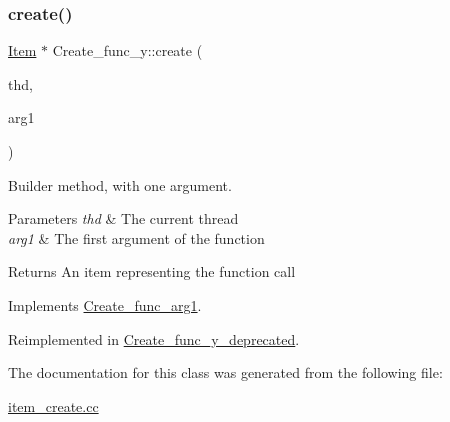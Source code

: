 \subsubsection{\texorpdfstring{create()}{create()}}
{\footnotesize\ttfamily \mbox{\hyperlink{classItem}{Item}} $\ast$ Create\+\_\+func\+\_\+y\+::create (\begin{DoxyParamCaption}\item[{T\+HD $\ast$}]{thd,  }\item[{\mbox{\hyperlink{classItem}{Item}} $\ast$}]{arg1 }\end{DoxyParamCaption})\hspace{0.3cm}{\ttfamily [virtual]}}

Builder method, with one argument. 
\begin{DoxyParams}{Parameters}
{\em thd} & The current thread \\
\hline
{\em arg1} & The first argument of the function \\
\hline
\end{DoxyParams}
\begin{DoxyReturn}{Returns}
An item representing the function call 
\end{DoxyReturn}


Implements \mbox{\hyperlink{classCreate__func__arg1_a3e9a98f755cd82c3e762e334c955a8c9}{Create\+\_\+func\+\_\+arg1}}.



Reimplemented in \mbox{\hyperlink{classCreate__func__y__deprecated_a0321bced52d2aeb8efaec4648937fb43}{Create\+\_\+func\+\_\+y\+\_\+deprecated}}.



The documentation for this class was generated from the following file\+:\begin{DoxyCompactItemize}
\item 
\mbox{\hyperlink{item__create_8cc}{item\+\_\+create.\+cc}}\end{DoxyCompactItemize}
